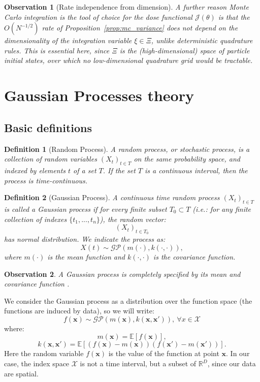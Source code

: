 \documentclass{article}
\newtheorem{defn}{Definition}
\newtheorem{obs}{Observation}
\begin{document}
	\begin{obs}[Rate independence from dimension]
		A further reason Monte Carlo integration is the tool of choice for the dose functional $\mathcal{J}(\theta)$ is that the $O(N^{-1/2})$ rate of Proposition~\ref{prop:mc_variance} does not depend on the dimensionality of the integration variable $\xi \in \Xi$, unlike deterministic quadrature rules. This is essential here, since $\Xi$ is the (high-dimensional) space of particle initial states, over which no low-dimensional quadrature grid would be tractable.
	\end{obs}
	
	\section{Gaussian Processes theory}
	\subsection{Basic definitions}
	\begin{defn}[Random Process]
		A \textit{random process}, or \textit{stochastic process}, is a collection of random variables $(X_t)_{t \in T}$ on the same probability space, and indexed by elements $t$ of a set $T$. If the set $T$ is a continuous interval, then the process is \textit{time-continuous}.
	\end{defn}
	
	\begin{defn}[Gaussian Process]
		A continuous time random process $(X_t)_{t \in T}$ is called a \textit{Gaussian process} if for every finite subset $T_0 \subset T$ (i.e.: for any finite collection of indexes $\{t_1, ..., t_n \}$), the random vector:
		$$(X_t)_{t \in T_0}$$
		has normal distribution. We indicate the process as:
		$$X(t) \sim \mathcal{GP}(m(\cdot), k(\cdot, \cdot)),$$
		where $m(\cdot)$ is the mean function and $k(\cdot, \cdot)$ is the covariance function.
	\end{defn}
	
	\begin{obs}
		A Gaussian process is completely specified by its mean and covariance function \cite{rasmussen_2005}.
	\end{obs}
	
	We consider the Gaussian process as a distribution over the function space (the functions are induced by data), so we will write:
	$$f(\mathbf{x}) \sim \mathcal{GP}(m(\mathbf{x}), k(\mathbf{x}, \mathbf{x'})), \ \forall x \in \mathcal{X}$$
	where:
	$$m(\mathbf{x}) = \mathbb{E}[f(\mathbf{x})],$$
	$$k(\mathbf{x}, \mathbf{x'}) = \mathbb{E}[(f(\mathbf{x}) - m(\mathbf{x}))(f(\mathbf{x'}) - m(\mathbf{x'}))].$$
	Here the random variable $f(\mathbf{x})$ is the value of the function at point $\mathbf{x}$. In our case, the index space $\mathcal{X}$ is not a time interval, but a subset of $\mathbb{R}^D$, since our data are spatial.
	
\end{document}
